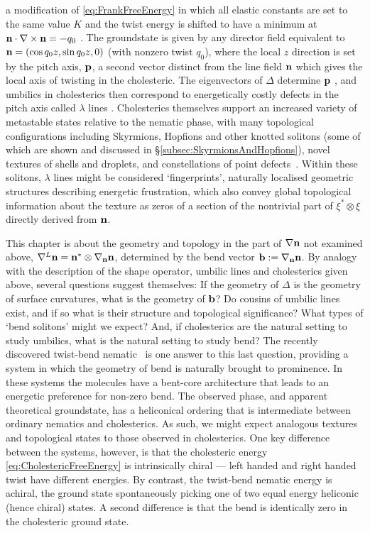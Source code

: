 a modification of \eqref{eq:FrankFreeEnergy} in which all elastic constants are set to the same value $K$ and the twist energy is shifted to have a minimum at $\mathbf{n} \cdot \nabla \times \mathbf{n} = -q_0$ \citep{deGennes1992}. The groundstate is given by any director field equivalent to $\mathbf{n} = (\cos q_0 z, \sin q_0 z, 0)$ (with nonzero twist $q_0$), where the local $z$ direction is set by the pitch axis, $\mathbf{p}$, a second vector distinct from the line field $\mathbf{n}$ which gives the local axis of twisting in the cholesteric. The eigenvectors of $\Delta$ determine $\mathbf{p}$ \citep{Bellar2014, Machon2016b}, and umbilics in cholesterics then correspond to energetically costly defects in the pitch axis called $\lambda$ lines \citep{Bellar2014}. Cholesterics themselves support an increased variety of metastable states relative to the nematic phase, with many topological configurations including Skyrmions, Hopfions and other knotted solitons (some of which are shown and discussed in \S \ref{subsec:SkyrmionsAndHopfions}), novel textures of shells and droplets, and constellations of point defects~\citep{posnjak17}. Within these solitons, $\lambda$ lines might be considered `fingerprints', naturally localised geometric structures describing energetic frustration, which also convey global topological information about the texture as zeros of a section of the nontrivial part of $\xi^* \otimes \xi$ directly derived from $\mathbf{n}$. 

This chapter is about the geometry and topology in the part of $\nabla \mathbf{n}$ not examined above, $\nabla^L \mathbf{n}= \mathbf{n}^* \otimes \nabla_{\mathbf{n}} \mathbf{n}$, determined by the bend vector $\mathbf{b}:= \nabla_{\mathbf{n}} \mathbf{n}$. By analogy with the description of the shape operator, umbilic lines and cholesterics given above, several questions suggest themselves: If the geometry of $\Delta$ is the geometry of surface curvatures, what is the geometry of $\mathbf{b}$? Do cousins of umbilic lines exist, and if so what is their structure and topological significance? What types of `bend solitons' might we expect? And, if cholesterics are the natural setting to study umbilics, what is the natural setting to study bend? The recently discovered twist-bend nematic~\citep{Cestari2011, Chen2013, Borshch2013, Lavrentovich2018} is one answer to this last question, providing a system in which the geometry of bend is naturally brought to prominence. In these systems the molecules have a bent-core architecture that leads to an energetic preference for non-zero bend. The observed phase, and apparent theoretical groundstate, has a heliconical ordering that is intermediate between ordinary nematics and cholesterics. As such, we might expect analogous textures and topological states to those observed in cholesterics. One key difference between the systems, however, is that the cholesteric energy \eqref{eq:CholestericFreeEnergy} is intrinsically chiral --- left handed and right handed twist have different energies. By contrast, the twist-bend nematic energy is achiral, the ground state spontaneously picking one of two equal energy heliconic (hence chiral) states. A second difference is that the bend is identically zero in the cholesteric ground state.

